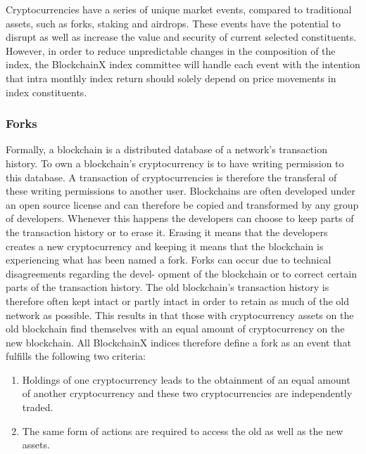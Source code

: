 \documentclass{article}
\begin{document}
Cryptocurrencies have a series of unique market events, compared to
traditional assets, such as forks, staking and airdrops. These events
have the potential to disrupt as well as increase the value and security
of current selected constituents. However, in order to reduce
unpredictable changes in the composition of the index, the BlockchainX
index committee will handle each event with the intention that intra
monthly index return should solely depend on price movements in index
constituents.

\subsubsection{Forks}\label{forks}

Formally, a blockchain is a distributed database of a network's
transaction history. To own a blockchain's cryptocurrency is to have
writing permission to this database. A transaction of cryptocurrencies
is therefore the transferal of these writing permissions to another
user. Blockchains are often developed under an open source license and
can therefore be copied and transformed by any group of developers.
Whenever this happens the developers can choose to keep parts of the
transaction history or to erase it. Erasing it means that the developers
creates a new cryptocurrency and keeping it means that the blockchain is
experiencing what has been named a fork. Forks can occur due to
technical disagreements regarding the devel- opment of the blockchain or
to correct certain parts of the transaction history. The old
blockchain's transaction history is therefore often kept intact or
partly intact in order to retain as much of the old network as possible.
This results in that those with cryptocurrency assets on the old
blockchain find themselves with an equal amount of cryptocurrency on the
new blockchain. All BlockchainX indices therefore define a fork as an
event that fulfills the following two criteria:

\begin{enumerate}
\def\labelenumi{\arabic{enumi}.}
\tightlist
\item
  Holdings of one cryptocurrency leads to the obtainment of an equal
  amount of another cryptocurrency and these two cryptocurrencies are
  independently traded.
\item
  The same form of actions are required to access the old as well as the
  new assets.
\end{enumerate}
\end{document}
